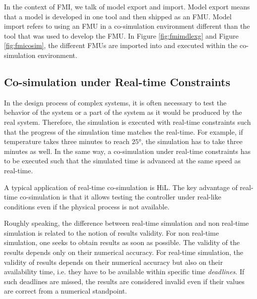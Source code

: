 In the context of FMI, we talk of model export and import. Model export means that a model is developed in one tool and then shipped as an FMU. Model import refers to using an FMU in a co-simulation environment different than the tool that was used to develop the FMU. In Figure \ref{fig:fmimdlexg} and Figure \ref{fig:fmicosim}, the different FMUs are imported into and executed within the co-simulation environment.



 

\subsection{Co-simulation under Real-time Constraints}

In the design process of complex systems, it is often necessary to test the behavior of the system or a part of the system as it would be produced by the real system. Therefore, the simulation is executed with real-time constraints such that the progress of the simulation time matches the real-time. For example, if temperature takes three minutes to reach $25$°, the simulation has to take three minutes as well. In the same way, a co-simulation under real-time constraints has to be executed such that the simulated time is advanced at the same speed as real-time.

A typical application of real-time co-simulation is HiL. The key advantage of real-time co-simulation is that it allows testing the controller under real-like conditions even if the physical process is not available.

Roughly speaking, the difference between real-time simulation and non real-time simulation is related to the notion of results validity. For non real-time simulation, one seeks to obtain results as soon as possible. The validity of the results depends only on their numerical accuracy. For real-time simulation, the validity of results depends on their numerical accuracy but also on their availability time, i.e. they have to be available within specific time \textit{deadlines}. If such deadlines are missed, the results are considered invalid even if their values are correct from a numerical standpoint.

